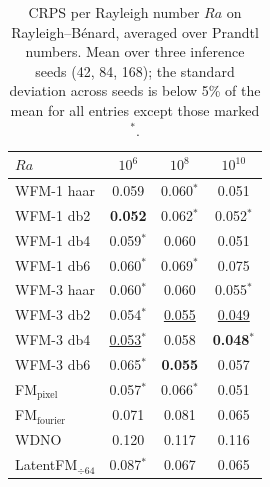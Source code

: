 \begin{table}[ht]
\centering
\caption{CRPS per Rayleigh number $Ra$ on Rayleigh--B\'enard, averaged over Prandtl numbers. Mean over three inference seeds (42, 84, 168); the standard deviation across seeds is below 5\% of the mean for all entries except those marked $^{*}$.}
\label{tab:ablation_rb_crps_ra}
\begin{tabular}{lccc}
\toprule
$Ra$ & $10^{6}$ & $10^{8}$ & $10^{10}$ \\
\midrule
WFM-1 haar & 0.059 & 0.060$^{*}$ & 0.051 \\
WFM-1 db2 & \textbf{0.052} & 0.062$^{*}$ & 0.052$^{*}$ \\
WFM-1 db4 & 0.059$^{*}$ & 0.060 & 0.051 \\
WFM-1 db6 & 0.060$^{*}$ & 0.069$^{*}$ & 0.075 \\
\midrule
WFM-3 haar & 0.060$^{*}$ & 0.060 & 0.055$^{*}$ \\
WFM-3 db2 & 0.054$^{*}$ & \underline{0.055} & \underline{0.049} \\
WFM-3 db4 & \underline{0.053}$^{*}$ & 0.058 & \textbf{0.048}$^{*}$ \\
WFM-3 db6 & 0.065$^{*}$ & \textbf{0.055} & 0.057 \\
\midrule
FM$_\text{pixel}$ & 0.057$^{*}$ & 0.066$^{*}$ & 0.051 \\
FM$_\text{fourier}$ & 0.071 & 0.081 & 0.065 \\
WDNO & 0.120 & 0.117 & 0.116 \\
LatentFM$_{\div 64}$ & 0.087$^{*}$ & 0.067 & 0.065 \\
\bottomrule
\end{tabular}
\end{table}
